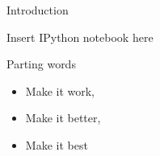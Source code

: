 \documentclass{beamer}
\begin{document}
\begin{frame}{Introduction}
  \begin{center}
    Insert IPython notebook here
  \end{center}
\end{frame}

\begin{frame}{Parting words}
  \begin{center}
    \begin{itemize}
      \item<1->[] Make it work,
      \item<2->[] Make it better,
      \item<3->[] Make it best
    \end{itemize}
  \end{center}
\end{frame}
\end{document}
